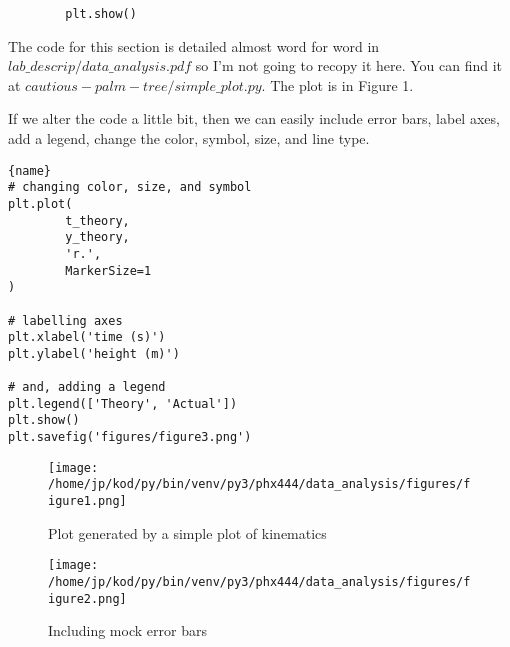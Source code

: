 \documentclass[journal, a4paper]{IEEEtran}
\begin{document}
\begin{lstlisting}
		plt.show()
\end{lstlisting}

The code for this section is detailed almost word for word in
$lab\_descrip/data\_analysis.pdf$ so I'm not going to recopy it here. You can
find it at $cautious-palm-tree/simple\_plot.py$. The plot is in Figure 1. 

If we alter the code a little bit, then we can easily include error bars, label axes, add a legend, change the
color, symbol, size, and line type. 

\begin{minipage}[t]{.45\textwidth}
\begin{lstlisting}[caption=Altering the Graphs, frame=tlrb]{name}
# changing color, size, and symbol
plt.plot(
		t_theory,
	   	y_theory,
	   	'r.',
	   	MarkerSize=1
)

# labelling axes
plt.xlabel('time (s)')
plt.ylabel('height (m)')

# and, adding a legend
plt.legend(['Theory', 'Actual'])
plt.show()
plt.savefig('figures/figure3.png')

\end{lstlisting}
\end{minipage}

\begin{figure}[h]
		\begin{center}
		\texttt{[image: /home/jp/kod/py/bin/venv/py3/phx444/data\_analysis/figures/figure1.png]}
		\caption{Plot generated by a simple plot of kinematics}
		\label{fig:fig_1}
		\end{center}
\end{figure}

\begin{figure}[t]
		\begin{center}
		\texttt{[image: /home/jp/kod/py/bin/venv/py3/phx444/data\_analysis/figures/figure2.png]}
		\caption{Including mock error bars}
		\label{fig:fig_2}
		\end{center}
\end{figure}
\end{document}
